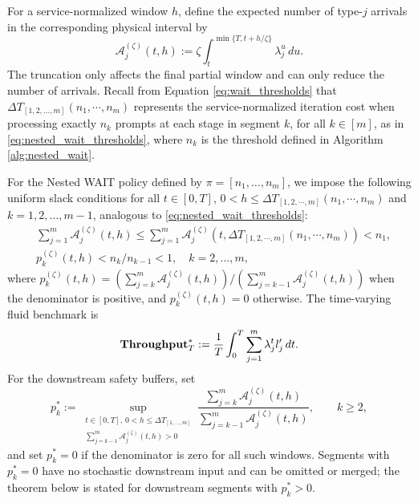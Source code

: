 For a service-normalized window \(h\), define the expected number of type-\(j\) arrivals in the corresponding physical interval by
\[
    \mathcal A_j^{(\zeta)}(t,h)
    :=
    \zeta\int_t^{\min\{T,t+h/\zeta\}}\lambda_j^u\,du .
\]
The truncation only affects the final partial window and can only reduce the number of arrivals.
Recall from Equation \eqref{eq:wait_thresholds} that $\Delta T_{[1,2,\dots,m]}(n_1,\cdots,n_m)$ represents the service-normalized iteration cost when processing exactly $n_k$ prompts at each stage in segment $k$, for all $k \in [m]$, as in \eqref{eq:nested_wait_thresholds}, where $n_k$ is the threshold defined in Algorithm \ref{alg:nested_wait}.

For the Nested WAIT policy defined by $\pi = [n_1, \dots, n_m]$, we impose the following uniform slack conditions for all $t\in [0, T]$, $0<h\leq \Delta T_{[1,2,\cdots,m]}(n_1,\cdots,n_m)$ and $k = 1, 2, \dots, m-1$, analogous to \eqref{eq:nested_wait_thresholds}:
\begin{equation}
    \label{eq:nested_wait_thresholds_time_varying}
\begin{aligned}
        & \sum_{j=1}^m \mathcal A_j^{(\zeta)}(t,h)
        \leq
        \sum_{j=1}^m \mathcal A_j^{(\zeta)}\!\left(t,\Delta T_{[1,2,\cdots,m]}(n_1,\cdots,n_m)\right)< n_1, \\
        & p_k^{(\zeta)}(t,h) < n_k/n_{k-1} < 1,\quad k=2,\dots,m,
\end{aligned}
\end{equation}
where \(p_k^{(\zeta)}(t,h)=(\sum_{j=k}^m\mathcal A_j^{(\zeta)}(t,h))/(\sum_{j=k-1}^m\mathcal A_j^{(\zeta)}(t,h))\) when the denominator is positive, and \(p_k^{(\zeta)}(t,h)=0\) otherwise. The time-varying fluid benchmark is
\[
    \textbf{Throughput}_T^*
    :=
    \frac{1}{T}\int_0^T\sum_{j=1}^m\lambda_j^t l_j'\,dt .
\]
For the downstream safety buffers, set
\[
    p_k^*
    :=
    \sup_{\substack{t\in[0,T],\,0<h\le \Delta T_{[1,\dots,m]}\\
    \sum_{j=k-1}^m\mathcal A_j^{(\zeta)}(t,h)>0}}
    \frac{\sum_{j=k}^m\mathcal A_j^{(\zeta)}(t,h)}
    {\sum_{j=k-1}^m\mathcal A_j^{(\zeta)}(t,h)},\qquad k\ge2,
\]
and set \(p_k^*=0\) if the denominator is zero for all such windows.
Segments with \(p_k^*=0\) have no stochastic downstream input and can be omitted or merged; the theorem below is stated for downstream segments with \(p_k^*>0\).
